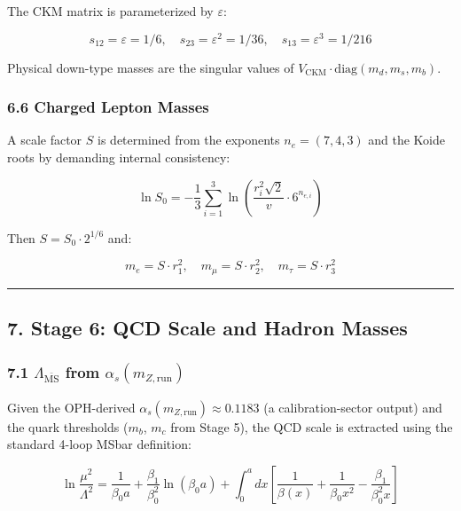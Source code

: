 The CKM matrix is parameterized by \(\varepsilon\):

\[s_{12} = \varepsilon = 1/6, \quad s_{23} = \varepsilon^2 = 1/36, \quad s_{13} = \varepsilon^3 = 1/216\]

Physical down-type masses are the singular values of \(V_{\text{CKM}} \cdot \text{diag}(m_d, m_s, m_b)\).

\subsubsection{6.6 Charged Lepton Masses}\label{66-charged-lepton-masses}

A scale factor \(S\) is determined from the exponents \(n_e = (7, 4, 3)\) and the Koide roots by demanding internal consistency:

\[\ln S_0 = -\frac{1}{3}\sum_{i=1}^3 \ln\left(\frac{r_i^2 \sqrt{2}}{v} \cdot 6^{n_{e,i}}\right)\]

Then \(S = S_0 \cdot 2^{1/6}\) and:

\[m_e = S \cdot r_1^2, \quad m_\mu = S \cdot r_2^2, \quad m_\tau = S \cdot r_3^2\]

\begin{center}\rule{0.5\linewidth}{0.5pt}\end{center}

\subsection{7. Stage 6: QCD Scale and Hadron Masses}\label{7-stage-6-qcd-scale-and-hadron-masses}

\subsubsection{\texorpdfstring{7.1 \(\Lambda_{\overline{\text{MS}}}\) from \(\alpha_s(m_{Z,\text{run}})\)}{7.1 \textbackslash Lambda\_\{\textbackslash overline\{\textbackslash text\{MS\}\}\} from \textbackslash alpha\_s(m\_\{Z,run\})}}\label{71-lambda_overlinetextms-from-alpha_sm_zrun}

Given the OPH-derived \(\alpha_s(m_{Z,\text{run}}) \approx 0.1183\) (a calibration-sector output) and the quark thresholds (\(m_b\), \(m_c\) from Stage 5), the QCD scale is extracted using the standard 4-loop MSbar definition:

\[\ln\frac{\mu^2}{\Lambda^2} = \frac{1}{\beta_0 a} + \frac{\beta_1}{\beta_0^2}\ln(\beta_0 a) + \int_0^a dx\left[\frac{1}{\beta(x)} + \frac{1}{\beta_0 x^2} - \frac{\beta_1}{\beta_0^2 x}\right]\]

